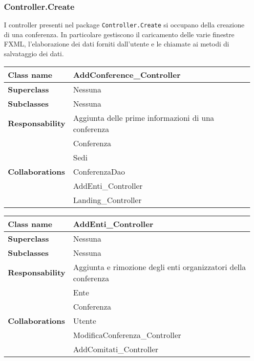 \subsubsection{Controller.Create}
I controller presenti nel package \texttt{Controller.Create} si occupano della creazione di una conferenza. In particolare gestiscono il caricamento delle varie finestre FXML, l'elaborazione dei dati forniti dall'utente e le chiamate ai metodi di salvataggio dei dati.
\begin{table}[h!]
    \begin{tabular}{|l|l|}
        \hline 
        \textbf{Class name} & AddConference\_Controller
        \\ \hline
        \textbf{Superclass} & Nessuna
        \\ \hline
        \multirow{1}{*}{\textbf{Subclasses}} & Nessuna
        \\ \hline
        \textbf{Responsability} & Aggiunta delle prime informazioni di una conferenza
        \\ \hline
        \multirow{5}{*}{\textbf{Collaborations}} & Conferenza \\
		& Sedi \\
		& ConferenzaDao \\
		& AddEnti\_Controller \\
		& Landing\_Controller
        \\ \hline
    \end{tabular}
\end{table}

\begin{table}[h!]
	\begin{tabular}{|l|l|}
		\hline 
		\textbf{Class name} & AddEnti\_Controller
		\\ \hline
		\textbf{Superclass} & Nessuna
		\\ \hline
		\multirow{1}{*}{\textbf{Subclasses}} & Nessuna
		\\ \hline
		\textbf{Responsability} & Aggiunta e rimozione degli enti organizzatori della conferenza
		\\ \hline
		\multirow{5}{*}{\textbf{Collaborations}} & Ente \\
		& Conferenza\\
		& Utente\\
		& ModificaConferenza\_Controller\\
		& AddComitati\_Controller
		\\ \hline
	\end{tabular}
\end{table}

